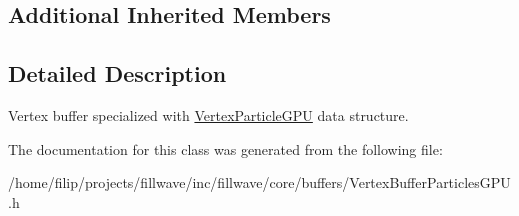 \subsection*{Additional Inherited Members}


\subsection{Detailed Description}
Vertex buffer specialized with \hyperlink{structflw_1_1flc_1_1VertexParticleGPU}{Vertex\+Particle\+G\+PU} data structure. 

The documentation for this class was generated from the following file\+:\begin{DoxyCompactItemize}
\item 
/home/filip/projects/fillwave/inc/fillwave/core/buffers/Vertex\+Buffer\+Particles\+G\+P\+U.\+h\end{DoxyCompactItemize}
